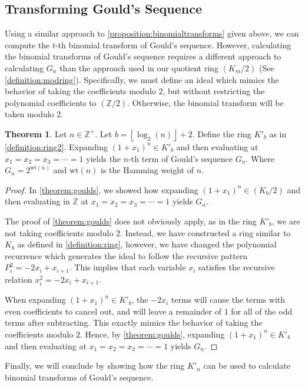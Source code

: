 \documentclass{article}
\theoremstyle{plain}
\theoremstyle{definition}
\newtheorem{theorem}{Theorem}
\newcommand{\floor}[1]{\left\lfloor #1 \right\rfloor}
\newcommand{\Z}{\mathbb{Z}}
\newcommand{\K}{K}
\newcommand{\wt}[1]{\text{wt}(#1)}
\begin{document}
\subsection{Transforming Gould's Sequence}
Using a similar approach to \cref{proposition:binomialtransforms} given above, we can compute the $t$-th binomial transform of Gould's sequence. However, calculating the binomial transforms of Gould's sequence requires a different approach to calculating $G_n$ than the approach used in our quotient ring $(K_m/2)$ (See \cref{definition:modring}). Specifically, we must define an ideal which mimics the behavior of taking the coefficients modulo $2$, but without restricting the polynomial coefficients to $(\Z/2)$. Otherwise, the binomial transform will be taken modulo $2$.

\begin{theorem} \label{theorem:goulds2}
Let $n \in \Z^+$. Let $b={\floor{\log_2(n)}+2}$. Define the ring $\K'_b$ as in \cref{definition:ring2}. Expanding $(1+x_1)^n \in \K'_b$ and then evaluating at $x_1=x_2=x_3=\cdots=1$ yields the $n$-th term of Gould's sequence $G_n$. Where $G_n = 2^{\wt{n}}$ and $\wt{n}$ is the Hamming weight of $n$.
\end{theorem}
\begin{proof}
In \cref{theorem:goulds}, we showed how expanding $(1+x_1)^n \in (\K_b/2)$ and then evaluating in $\Z$ at $x_1=x_2=x_3=\cdots=1$ yields $G_n$.

The proof of \cref{theorem:goulds} does not obviously apply, as in the ring $\K'_b$, we are not taking coefficients modulo $2$. Instead, we have constructed a ring similar to $K_b$ as defined in \cref{definition:ring}, however, we have changed the polynomial recurrence which generates the ideal to follow the recursive pattern $P_{i}^2 = -2 x_i + x_{i+1}$. This implies that each variable $x_i$ satisfies the recursive relation $x_i^2 = -2x_i + x_{i+1}$.

When expanding $(1+x_1)^n \in \K'_b$, the $-2x_i$ terms will cause the terms with even coefficients to cancel out, and will leave a remainder of $1$ for all of the odd terms after subtracting. This exactly mimics the behavior of taking the coefficients modulo $2$. Hence, by \cref{theorem:goulds}, expanding $(1+x_1)^n \in \K'_b$ and then evaluating at $x_1=x_2=x_3=\cdots=1$ yields $G_n$.
\end{proof}

Finally, we will conclude by showing how the ring $K'_n$ can be used to calculate binomial transforms of Gould's sequence.
\end{document}
